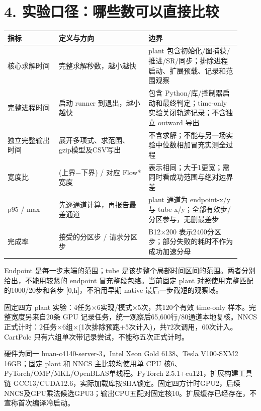 \documentclass[UTF8,fontset=fandol,11pt,a4paper]{ctexart}
\begin{document}
\section*{4. 实验口径：哪些数可以直接比较}
\small
\par\noindent
{\setlength{\tabcolsep}{2pt}\renewcommand{\arraystretch}{1.25}
\begin{tabular}{>{\raggedright\arraybackslash}p{0.202\linewidth}>{\raggedright\arraybackslash}p{0.350\linewidth}>{\raggedright\arraybackslash}p{0.368\linewidth}}
\toprule
\textbf{指标} & \textbf{定义与方向} & \textbf{边界} \\
\midrule
核心求解时间 & 完整求解秒数，越小越快 & plant 包含初始化/\allowbreak{}图捕获/\allowbreak{}推进/\allowbreak{}SR/\allowbreak{}同步；排除进程启动、扩展预载、记录和范围观察 \\
完整进程时间 & 启动 runner 到退出，越小越快 & 包含 Python/\allowbreak{}库/\allowbreak{}控制器启动和最终判定；time-only 实验关闭轨迹记录；不含独立 outward 导出 \\
独立完整输出时间 & 展开多项式、求范围、gzip模型及CSV写出 & 不含求解；不能与另一场实验中位数相加冒充实测全过程 \\
宽度比 & (上界−下界) /\allowbreak{} 对应 Flow* 宽度 & 1 表示相同；大于1更宽；需同时看成功范围与绝对边界差 \\
p95 /\allowbreak{} max & 先逐通道计算，再报告最差通道 & plant 通道为 endpoint-x/\allowbreak{}y 与 tube-x/\allowbreak{}y；全部有效步/\allowbreak{}分区参与，无删最差步 \\
完成率 & 接受的分区步 /\allowbreak{} 请求分区步 & B12×200 表示2400分区步；部分失败的耗时不作为成功加速分母 \\
\bottomrule
\end{tabular}
}
\par

\normalsize
Endpoint 是每一步末端的范围；tube 是该步整个局部时间区间的范围。两者分别给出，不能用较紧的 endpoint 冒充整段包络。当前固定 plant 对照使用完整匹配的1000/\allowbreak{}20步和各步 [0,h]，不沿用早期 native 最后一步截短的观察域。

固定四方 plant 实验：4任务×6实现/\allowbreak{}模式×5次，共120个有效 time-only 样本。完整宽度另来自20条 GPU 记录任务，统一观察后65,600行/\allowbreak{}80通道本地复核。NNCS 正式计时：2任务×6组×(1次排除预跑+5次计入)，共72次调用，60次计入。CartPole 只有六组单次带记录尝试，不能称五次正式计时。

硬件为同一 huan-c4140-server-3，Intel Xeon Gold 6138、Tesla V100-SXM2 16GB；固定 plant 和 NNCS 主比较均使用单 CPU 核6、PyTorch/\allowbreak{}OMP/\allowbreak{}MKL/\allowbreak{}OpenBLAS单线程。PyTorch 2.5.1+cu121，扩展构建工具链 GCC13/\allowbreak{}CUDA12.6，实际加载库按SHA锁定。固定四方计时GPU2，后续NNCS及GPU乘法候选GPU3；输出CPU五配对固定核10。扩展缓存已经存在，不宣称首次编译冷启动。
\end{document}
